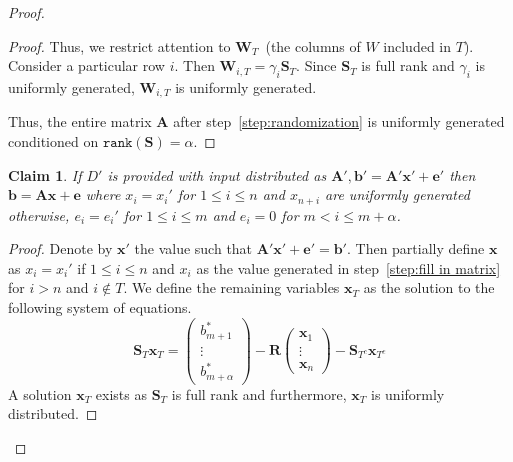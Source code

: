 \documentclass[11pt]{article}
\newcommand{\vect}[1]{\ensuremath{\textbf{#1}}}
\newcommand{\rank}{\ensuremath{\mathtt{rank}}\xspace}
\newtheorem{claim}[theorem]{Claim}
\newcommand{\ve}{\vect{e}}
\newcommand{\vS}{\vect{S}}
\newcommand{\vA}{\vect{A}}
\newcommand{\vW}{\vect{W}}
\newcommand{\vR}{\vect{R}}
\newcommand{\vx}{\vect{x}}
\newcommand{\va}{\vect{a}}
\newcommand{\vb}{\vect{b}}
\begin{document}
\begin{proof}
\begin{proof}
Thus, we restrict attention to $\vW_T$~(the columns of $W$ included in $T$).  Consider a particular row $i$.  Then $\vW_{i, T} = \gamma_i \vS_{T}$.  Since $\vS_T$ is full rank and $\gamma_i$ is uniformly generated, $\vW_{i, T}$ is uniformly generated.

Thus, the entire matrix $\vA$ after step~\ref{step:randomization} is uniformly generated conditioned on $\rank(\vS) = \alpha$.
\end{proof}
\begin{claim}
\label{cl:random ax+e}
If $D'$ is provided with input distributed as $\vA', \vb' = \vA'\vx'+\ve'$ then $\vb = \vA \vx+\ve$ where $x_i = x_i'$ for $1\leq i \leq n$ and $x_{n+i}$ are uniformly generated otherwise,  $e_i = e_i'$ for $1\leq i\leq m$ and $e_i = 0$ for $m<i\leq m+\alpha$.
\end{claim}
\begin{proof}
Denote by $\vx'$ the value such that $\vA'\vx'+\ve' = \vb'$.  
Then partially define $\vx$ as $x_i = x_i'$ if $1\leq i \leq n$ and $x_i$ as the value generated in step~\ref{step:fill in matrix} for $i>n $ and $i\not\in T$.  We define the remaining variables $\vx_T$ as the solution to the following system of equations.
\[
\vS_T  \vx_T = \begin{pmatrix} b_{m+1}^*  \\ \vdots \\b_{m+\alpha}^* \end{pmatrix}  - \vR \begin{pmatrix} \vx_1  \\ \vdots \\\vx_n \end{pmatrix}- \vS_{T^c} \vx_{T^c}  
\]
A solution $\vx_T$ exists as $\vS_T$ is full rank and furthermore, $\vx_T$ is uniformly distributed.

\end{proof}
\end{proof}
\end{document}

